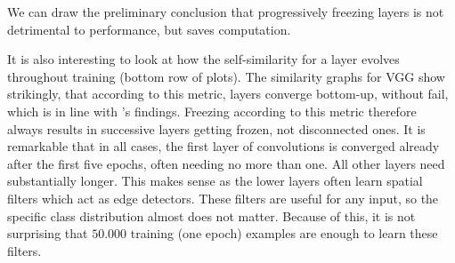 We can draw the preliminary conclusion that progressively freezing layers is not
detrimental to performance, but saves computation.

It is also interesting to look at how the self-similarity for a layer evolves
throughout training (bottom row of plots). The similarity graphs for VGG show
strikingly, that according to this metric, layers converge bottom-up, without
fail, which is in line with \citet{raghu2017svcca}'s findings. Freezing
according to this metric therefore always results in successive layers getting
frozen, not disconnected ones. It is remarkable that in all cases, the first
layer of convolutions is converged already after the first five epochs, often
needing no more than one. All other layers need substantially longer. This makes
sense as the lower layers often learn spatial filters which act as edge
detectors. These filters are useful for any input, so the specific class
distribution almost does not matter. Because of this, it is not surprising that
$50.000$ training (one epoch) examples are enough to learn these filters.

